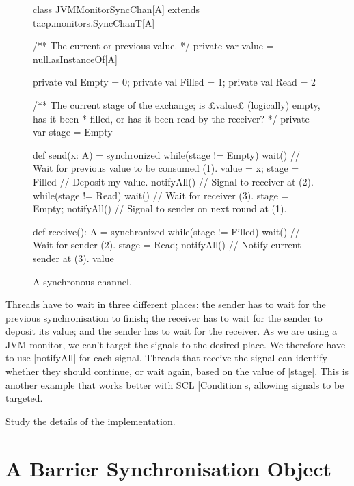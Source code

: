 
\begin{figure}
\begin{scala}
class JVMMonitorSyncChan[A] extends tacp.monitors.SyncChanT[A]{
  /** The current or previous value. */
  private var value = null.asInstanceOf[A]

  private val Empty = 0; private val Filled = 1; private val Read = 2

  /** The current stage of the exchange; is £value£ (logically) empty, has it been
    * filled, or has it been read by the receiver? */
  private var stage = Empty

  def send(x: A) = synchronized{
    while(stage != Empty) wait() // Wait for previous value to be consumed (1).
    value = x; stage = Filled   // Deposit my value.
    notifyAll() // Signal to receiver at (2).
    while(stage != Read) wait() // Wait for receiver (3).
    stage = Empty; notifyAll() // Signal to sender on next round at (1).
  }

  def receive(): A = synchronized{
    while(stage != Filled) wait() // Wait for sender (2).
    stage = Read; notifyAll()     // Notify current sender at (3).
    value
  }
}
\end{scala}
\caption{A synchronous channel.}
\label{fig:JVM-SyncChan}
\end{figure}


Threads have to wait in three different places: the sender has to wait for the
previous synchronisation to finish; the receiver has to wait for the sender to
deposit its value; and the sender has to wait for the receiver.  As we are
using a JVM monitor, we can't target the signals to the desired place.  We
therefore have to use |notifyAll| for each signal.  
Threads that receive the
signal can identify whether they should continue, or wait again, based on the
value of |stage|.
This is another example that works better with SCL |Condition|s, allowing
signals to be targeted.


\begin{instruction}
Study the details of the implementation.
\end{instruction}


\section{A Barrier Synchronisation Object}

